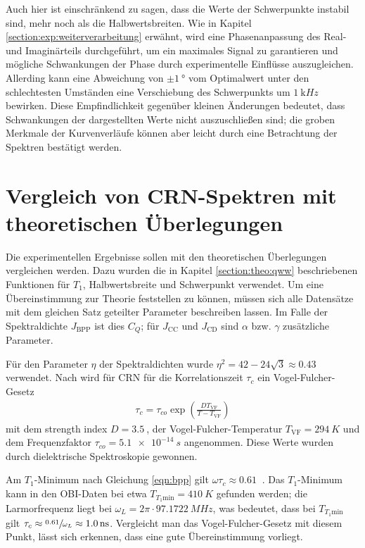 Auch hier ist einschränkend zu sagen, dass die Werte der Schwerpunkte instabil sind, mehr noch als die Halbwertsbreiten. Wie in Kapitel \ref{section:exp:weiterverarbeitung} erwähnt, wird eine Phasenanpassung des Real- und Imaginärteils durchgeführt, um ein maximales Signal zu garantieren und mögliche Schwankungen der Phase durch experimentelle Einflüsse auszugleichen. Allerding kann eine Abweichung von $\pm \SI{1}{\degree}$ vom Optimalwert unter den schlechtesten Umständen eine Verschiebung des Schwerpunkts um $\SI{1}{\kilo Hz}$ bewirken. Diese Empfindlichkeit gegenüber kleinen Änderungen bedeutet, dass Schwankungen der dargestellten Werte nicht auszuschließen sind; die groben Merkmale der Kurvenverläufe können aber leicht durch eine Betrachtung der Spektren bestätigt werden.




\section{Vergleich von CRN-Spektren mit theoretischen Überlegungen} \label{section:res:theorie}

Die experimentellen Ergebnisse sollen mit den theoretischen Überlegungen vergleichen werden. Dazu wurden die in Kapitel \ref{section:theo:qww} beschriebenen Funktionen für $T_1$, Halbwertsbreite und Schwerpunkt verwendet. Um eine Übereinstimmung zur Theorie feststellen zu können, müssen sich alle Datensätze mit dem gleichen Satz geteilter Parameter beschreiben lassen. Im Falle der Spektraldichte $J_\text{BPP}$ ist dies $C_Q$; für $J_\text{CC}$ und $J_\text{CD}$ sind $\alpha$ bzw. $\gamma$ zusätzliche Parameter.

Für den Parameter $\eta$ der Spektraldichten wurde $\eta^2 = 42 - 24 \sqrt{3} \approx \SI{0.43}{}$ \cite{caer} verwendet. Nach \cite{PIMENOV199793} wird für CRN für die Korrelationszeit $\tau_c$ ein Vogel-Fulcher-Gesetz
\begin{align}
	\tau_c = \tau_{co} \exp \left( \frac{D T_\text{VF}}{T-T_\text{VF}} \right)
\end{align}
mit dem strength index $D = \SI{3.5}{}$, der Vogel-Fulcher-Temperatur $T_\text{VF} = \SI{294}{K}$ und dem Frequenzfaktor $\tau_{co} = \SI{5.1e-14}{s}$ angenommen. Diese Werte wurden durch dielektrische Spektroskopie gewonnen.

Am $T_1$-Minimum nach Gleichung \eqref{eqn:bpp} gilt $\omega \tau_c \approx \SI{0.61}{}$ \cite[S. 629]{omegatau061}. Das $T_1$-Minimum kann in den OBI-Daten bei etwa $T_{T_1 \text{min}} = \SI{410}{K}$ gefunden werden; die Larmorfrequenz liegt bei $\omega_L = 2\pi \cdot \SI{97.1722}{MHz}$, was bedeutet, dass bei $T_{T_1 \text{min}}$ gilt $\tau_c \approx \sfrac{\SI{0.61}{}}{\omega_L} \approx \SI{1.0}{\nano s}$. Vergleicht man das Vogel-Fulcher-Gesetz mit diesem Punkt, lässt sich erkennen, dass eine gute Übereinstimmung vorliegt.

